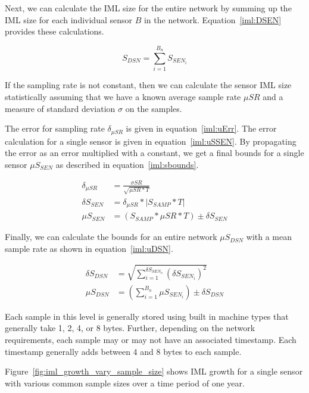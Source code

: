 Next, we can calculate the IML size for the entire network by summing up the IML size for each individual sensor $B$ in the network. Equation~\ref{iml:DSEN} provides these calculations.

\begin{equation}\label{iml:DSEN}
	S_{DSN} = \sum_{i=1}^{B_{n}} S_{SEN_{i}}
\end{equation}

If the sampling rate is not constant, then we can calculate the sensor IML size statistically assuming that we have a known average sample rate $\mu SR$ and a measure of standard deviation $\sigma$ on the samples.

The error for sampling rate $\delta_{\mu SR}$ is given in equation~\ref{iml:uErr}. The error calculation for a single sensor is given in equation~\ref{iml:uSSEN}. By propagating the error as an error multiplied with a constant, we get a final bounds for a single sensor $\mu S_{SEN}$ as described in equation~\ref{iml:sbounds}.

\begin{align}
	\delta_{\mu SR} &= \frac{\sigma SR}{\sqrt{\mu SR * T}} \label{iml:uErr} \\
	\delta S_{SEN} &= \delta_{\mu SR} * |S_{SAMP} * T| \label{iml:uSSEN}  \\
	\mu S_{SEN} &= (S_{SAMP} * \mu SR * T) \pm \delta S_{SEN} \label{iml:sbounds}
\end{align}

Finally, we can calculate the bounds for an entire network $\mu S_{DSN}$ with a mean sample rate as shown in equation~\ref{iml:uDSN}.

\begin{align}
	\delta S_{DSN} &= \sqrt{\sum_{i=1}^{\delta S_{SEN_{n}}} (\delta S_{SEN_{i}})^2} \label{iml:dDSN} \\
	\mu S_{DSN} &= (\sum_{i=1}^{B_{n}} \mu S_{SEN_{i}}) \pm \delta S_{DSN} \label{iml:uDSN}
\end{align}

Each sample in this level is generally stored using built in machine types that generally take 1, 2, 4, or 8 bytes. Further, depending on the network requirements, each sample may or may not have an associated timestamp. Each timestamp generally adds between 4 and 8 bytes to each sample.

Figure~\ref{fig:iml_growth_vary_sample_size} shows IML growth for a single sensor with various common sample sizes over a time period of one year.

